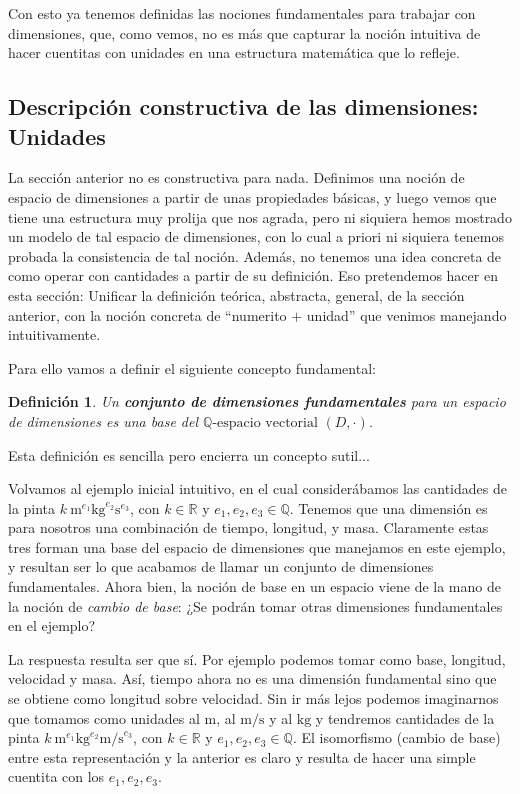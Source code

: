 \documentclass{article}
\def\qev{$\mathbb{Q} \mbox{-espacio vectorial } $}
\newtheorem{definicion}{{\sc Definición}}
\begin{document}
Con esto ya tenemos definidas las nociones fundamentales para trabajar con dimensiones, que, como vemos, no es más que
capturar la noción intuitiva de hacer cuentitas con unidades en una estructura matemática que lo refleje.

\subsection{Descripción constructiva de las dimensiones: Unidades}

La sección anterior no es constructiva para nada. Definimos una noción de espacio de dimensiones a partir de unas propiedades
básicas, y luego vemos que tiene
una estructura muy prolija que nos agrada, pero ni siquiera hemos mostrado un modelo de tal espacio de dimensiones, con
lo cual a priori ni siquiera tenemos probada la consistencia de tal noción. Además, no tenemos una idea concreta de como
operar con cantidades a partir de su definición. Eso pretendemos hacer en esta sección: Unificar la definición teórica,
abstracta, general, de la sección anterior, con la noción concreta de ``numerito $+$ unidad'' que venimos manejando
intuitivamente.

Para ello vamos a definir el siguiente concepto fundamental:

\begin{definicion}
Un \textbf{conjunto de dimensiones fundamentales} para un espacio de dimensiones es una base del \qev $(D, \cdot)$.
\end{definicion}

Esta definición es sencilla pero encierra un concepto sutil...

Volvamos al ejemplo inicial intuitivo, en el cual considerábamos las cantidades de la pinta
$k \ \si{\meter}^{e_1}\si{\kilogram}^{e_2}\si{\second}^{e_3}$, con $k \in \mathbb{R}$ y $e_1,e_2,e_3 \in \mathbb{Q}$.
Tenemos que una dimensión es para nosotros una combinación de tiempo, longitud, y masa. Claramente estas tres forman una base
del espacio de dimensiones que manejamos en este ejemplo, y resultan ser lo que acabamos de llamar un conjunto de dimensiones
fundamentales. Ahora bien, la noción de base en un espacio viene de la mano de la noción de \textit{cambio de base}: ¿Se
podrán tomar otras dimensiones fundamentales en el ejemplo?

La respuesta resulta ser que sí. Por ejemplo podemos tomar como base, longitud, velocidad y masa. Así, tiempo ahora no es
una dimensión fundamental sino que se obtiene como longitud sobre velocidad. Sin ir más lejos podemos imaginarnos que
tomamos como unidades al $\si{\meter}$, al $\si{\meter\per\second}$ y al $\si{\kilogram}$ y tendremos cantidades de la
pinta
$k \ \si{\meter}^{e_1}\si{\kilogram}^{e_2}\si{\meter\per\second}^{e_3}$, con $k \in \mathbb{R}$ y $e_1,e_2,e_3 \in \mathbb{Q}$.
El isomorfismo (cambio de base) entre esta representación y la anterior es claro y resulta de hacer una simple cuentita
con los $e_1, e_2, e_3$.
\end{document}
